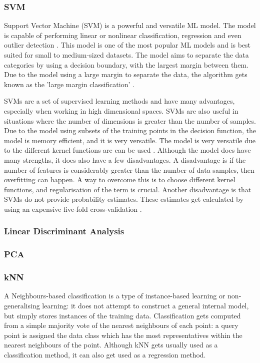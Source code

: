 	\subsubsection{SVM}
	Support Vector Machine (SVM) is a powerful and versatile ML model. The model is capable of performing linear or nonlinear classification, regression and even outlier detection \cite{geron2019hands, sklearn_svm}. This model is one of the most popular ML models and is best suited for small to medium-sized datasets. The model aims to separate the data categories by using a decision boundary, with the largest margin between them. Due to the model using a large margin to separate the data, the algorithm gets known as the 'large margin classification' \cite{geron2019hands}.
	
	SVMs are a set of supervised learning methods and have many advantages, especially when working in high dimensional spaces. SVMs are also useful in situations where the number of dimensions is greater than the number of samples. Due to the model using subsets of the training points in the decision function, the model is memory efficient, and it is very versatile. The model is very versatile due to the different kernel functions are can be used \cite{sklearn_svm}. Although the model does have many strengths, it does also have a few disadvantages. A disadvantage is if the number of features is considerably greater than the number of data samples, then overfitting can happen. A way to overcome this is to choose different kernel functions, and regularisation of the term is crucial. Another disadvantage is that SVMs do not provide probability estimates. These estimates get calculated by using an expensive five-fold cross-validation \cite{sklearn_svm}.
	
	\subsubsection{Linear Discriminant Analysis}
	
	\subsubsection{PCA}
	
	\subsubsection{kNN}
		\label{seb_sec:kNN}
		A Neighbours-based classification is a type of instance-based learning or non-generalising learning: it does not attempt to construct a general internal model, but simply stores instances of the training data. Classification gets computed from a simple majority vote of the nearest neighbours of each point: a query point is assigned the data class which has the most representatives within the nearest neighbours of the point. Although kNN gets usually used as a classification method, it can also get used as a regression method.
		

